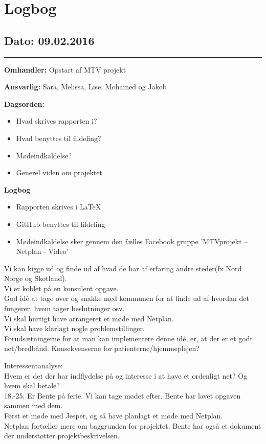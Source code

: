 \chapter{Logbog}



\section{Dato: 09.02.2016}
\hrule

\textbf{Omhandler:} Opstart af MTV projekt

\textbf{Ansvarlig:} Sara, Melissa, Lise, Mohamed og Jakob

\textbf{Dagsorden:}
\begin{itemize}
	\item Hvad skrives rapporten i?
	\item Hvad benyttes til fildeling?
	\item Mødeindkaldelse?
	\item Generel viden om projektet
\end{itemize}

\textbf{Logbog}
\begin{itemize}
	\item Rapporten skrives i LaTeX
	\item GitHub benyttes til fildeling
	\item Mødeindkaldelse sker gennem den fælles Facebook gruppe ’MTVprojekt – Netplan - Video’
\end{itemize}

Vi kan kigge ud og finde ud af hvad de har af erfaring andre steder(fx Nord Norge og Skotland).\\
Vi er koblet på en konsulent opgave.\\
God idé at tage over og snakke med kommunen for at finde ud af hvordan det fungerer, hvem tager beslutninger osv.\\
Vi skal hurtigt have arrangeret et møde med Netplan.\\
Vi skal have klarlagt nogle problemstillinger. \\
Forudsætningerne for at man kan implementere denne idé, er, at der er et godt net/bredbånd.
Konsekvenserne for patienterne/hjemmeplejen?

Interessentanalyse: \\
Hvem er det der har indflydelse på og interesse i at have et ordenligt net?
Og hvem skal betale?\\ 
18.-25. Er Bente på ferie.
Vi kan tage mødet efter. Bente har lavet opgaven sammen med dem.\\
Først et møde med Jesper, og så have planlagt et møde med Netplan.\\
Netplan fortæller mere om baggrunden for projektet.
Bente har også et dokument der understøtter projektbeskrivelsen.
\\


